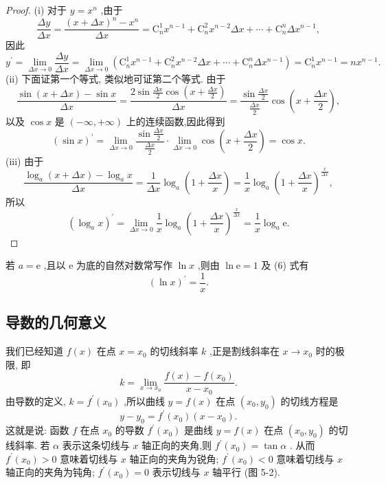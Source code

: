 \begin{proof}
(i) 对于 \(y = {x}^{n}\) ,由于
\[
\frac{\Delta y}{\Delta x} = \frac{{\left( x + \Delta x\right) }^{n} - {x}^{n}}{\Delta x} = {\mathrm{C}}_{n}^{1}{x}^{n - 1} + {\mathrm{C}}_{n}^{2}{x}^{n - 2}{\Delta x} + \cdots  + {\mathrm{C}}_{n}^{n}\Delta {x}^{n - 1},
\]
因此
\[
{y}^{\prime } = \mathop{\lim }\limits_{{{\Delta x} \rightarrow  0}}\frac{\Delta y}{\Delta x} = \mathop{\lim }\limits_{{{\Delta x} \rightarrow  0}}\left( {{\mathrm{C}}_{n}^{1}{x}^{n - 1} + {\mathrm{C}}_{n}^{2}{x}^{n - 2}{\Delta x} + \cdots  + {\mathrm{C}}_{n}^{n}\Delta {x}^{n - 1}}\right)  = {\mathrm{C}}_{n}^{1}{x}^{n - 1} = n{x}^{n - 1}.
\]
(ii) 下面证第一个等式, 类似地可证第二个等式. 由于
\[
\frac{\sin \left( {x + {\Delta x}}\right)  - \sin x}{\Delta x} = \frac{2\sin \frac{\Delta x}{2}\cos \left( {x + \frac{\Delta x}{2}}\right) }{\Delta x} = \frac{\sin \frac{\Delta x}{2}}{\frac{\Delta x}{2}}\cos \left( {x + \frac{\Delta x}{2}}\right) ,
\]
以及 \(\cos x\) 是 \(\left( {-\infty , + \infty }\right)\) 上的连续函数,因此得到
\[
{\left( \sin x\right) }^{\prime } = \mathop{\lim }\limits_{{{\Delta x} \rightarrow  0}}\frac{\sin \frac{\Delta x}{2}}{\frac{\Delta x}{2}} \cdot  \mathop{\lim }\limits_{{{\Delta x} \rightarrow  0}}\cos \left( {x + \frac{\Delta x}{2}}\right)  = \cos x.
\]
(iii) 由于
\[
\frac{{\log }_{a}\left( {x + {\Delta x}}\right)  - {\log }_{a}x}{\Delta x} = \frac{1}{\Delta x}{\log }_{a}\left( {1 + \frac{\Delta x}{x}}\right)  = \frac{1}{x}{\log }_{a}{\left( 1 + \frac{\Delta x}{x}\right) }^{\frac{x}{\Delta x}},
\]
所以
\[
{\left( {\log }_{a}x\right) }^{\prime } = \mathop{\lim }\limits_{{{\Delta x} \rightarrow  0}}\frac{1}{x}{\log }_{a}{\left( 1 + \frac{\Delta x}{x}\right) }^{\frac{x}{\Delta x}} = \frac{1}{x}{\log }_{a}\mathrm{e}. \tag{6}
\]
\end{proof}

若 \(a = \mathrm{e}\) ,且以 \(\mathrm{e}\) 为底的自然对数常写作 \(\ln x\) ,则由 \(\ln \mathrm{e} = 1\) 及 (6) 式有
\[
{\left( \ln x\right) }^{\prime } = \frac{1}{x}.
\]
\subsection{导数的几何意义}

我们已经知道 \(f\left( x\right)\) 在点 \(x = {x}_{0}\) 的切线斜率 \(k\) ,正是割线斜率在 \(x \rightarrow  {x}_{0}\) 时的极限, 即
\[
k = \mathop{\lim }\limits_{{x \rightarrow  {x}_{0}}}\frac{f\left( x\right)  - f\left( {x}_{0}\right) }{x - {x}_{0}}.
\]
由导数的定义, \(k = {f}^{\prime }\left( {x}_{0}\right)\) ,所以曲线 \(y = f\left( x\right)\) 在点 \(\left( {{x}_{0},{y}_{0}}\right)\) 的切线方程是
\[
y - {y}_{0} = {f}^{\prime }\left( {x}_{0}\right) \left( {x - {x}_{0}}\right) . \tag{7}
\]
这就是说: 函数 \(f\) 在点 \({x}_{0}\) 的导数 \({f}^{\prime }\left( {x}_{0}\right)\) 是曲线 \(y = f\left( x\right)\) 在点 \(\left( {{x}_{0},{y}_{0}}\right)\) 的切线斜率. 若 \(\alpha\) 表示这条切线与 \(x\) 轴正向的夹角,则 \({f}^{\prime }\left( {x}_{0}\right)  = \tan \alpha\) . 从而 \({f}^{\prime }\left( {x}_{0}\right)  > 0\) 意味着切线与 \(x\) 轴正向的夹角为锐角; \({f}^{\prime }\left( {x}_{0}\right)  < 0\) 意味着切线与 \(x\) 轴正向的夹角为钝角; \({f}^{\prime }\left( {x}_{0}\right)  = 0\) 表示切线与 \(x\) 轴平行 (图 5-2).

